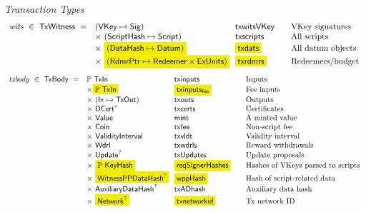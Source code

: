 \begin{figure*}[htb]
  \emph{Transaction Types}
  \begin{equation*}
    \begin{array}{r@{~~}l@{~~}l@{\qquad}l}
      \var{wits} ~\in~ \TxWitness ~=~
       & (\VKey \mapsto \Sig) & \fun{txwitsVKey} & \text{VKey signatures}\\
       & \times ~(\ScriptHash \mapsto \Script)  & \fun{txscripts} & \text{All scripts}\\
       & \times~ \hldiff{(\DataHash \mapsto \Datum)} & \hldiff{\fun{txdats}} & \text{All datum objects}\\
       & \times ~\hldiff{(\RdmrPtr \mapsto \Redeemer \times \ExUnits)}& \hldiff{\fun{txrdmrs}}& \text{Redeemers/budget}\\
    \end{array}
  \end{equation*}
  \begin{equation*}
    \begin{array}{r@{~~}l@{~~}l@{\qquad}l}
      \var{txbody} ~\in~ \TxBody ~=~
      & \powerset{\TxIn} & \fun{txinputs}& \text{Inputs}\\
      & \times \hldiff{\powerset{\TxIn}} & \hldiff{\fun{txinputs_{fee}}}& \text{Fee inputs}\\
      &\times ~(\Ix \mapsto \TxOut) & \fun{txouts}& \text{Outputs}\\
      & \times~ \seqof{\DCert} & \fun{txcerts}& \text{Certificates}\\
       & \times ~\Value  & \fun{mint} &\text{A minted value}\\
       & \times ~\Coin & \fun{txfee} &\text{Non-script fee}\\
       & \times ~\ValidityInterval & \fun{txvldt} & \text{Validity interval}\\
       & \times~ \Wdrl  & \fun{txwdrls} &\text{Reward withdrawals}\\
       & \times ~\Update^?  & \fun{txUpdates} & \text{Update proposals}\\
       & \times ~\hldiff{\powerset{\KeyHash}} & \hldiff{\fun{reqSignerHashes}} & \text{Hashes of VKeys passed to scripts}\\
       & \times ~\hldiff{\WitnessPPDataHash^?} & \hldiff{\fun{wppHash}} & \text{Hash of script-related data}\\
       & \times ~\AuxiliaryDataHash^? & \fun{txADhash} & \text{Auxiliary data hash}\\
       & \times ~\hldiff{\Network^?} & \hldiff{\fun{txnetworkid}} & \text{Tx network ID}\\

\end{array}
\end{equation*}
\end{figure*}
